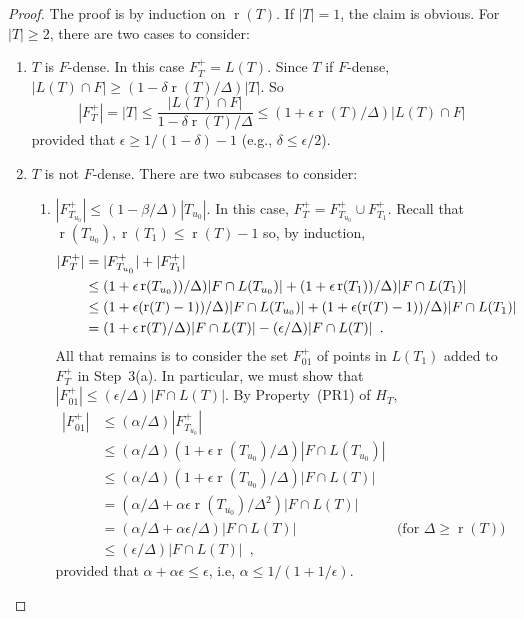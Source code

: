 \documentclass{patmorin}
\DeclareMathOperator{\rank}{r}
\begin{document}
\begin{proof}
  The proof is by induction on $\rank(T)$. If $|T|=1$, the claim is
  obvious. For $|T|\ge 2$, there are two cases to consider:
  \begin{enumerate}
    \item $T$ is $F$-dense. In this case $F^+_T=L(T)$.  
     Since $T$ if $F$-dense,  $|L(T)\cap F|\ge
     (1-\delta\rank(T)/\Delta)|T|$.  So
     \[
       |F^+_T|=|T|
	  \le \frac{|L(T)\cap F|}{1-\delta\rank(T)/\Delta} 
          \le (1+\epsilon\rank(T)/\Delta)|L(T)\cap F|
     \]
     provided that $\epsilon \ge 1/(1-\delta)-1$ (e.g., $\delta\le \epsilon/2$).

    \item $T$ is not $F$-dense. There are two subcases to consider:
    \begin{enumerate}
       \item $|F^+_{T_{u_0}}| \le (1-\beta/\Delta)|T_{u_0}|$.
         In this case, $F^+_T=F^+_{T_{u_0}}\cup F^+_{T_1}$.
         Recall that
        $\rank(T_{u_0}),\rank(T_1)\le\rank(T)-1$ so, by induction,
         \begin{align}
            |F^+_T| 
              & = |F^+_{T_{u_0}}| + |F^+_{T_{1}}|  \notag \\
              & \le (1+\epsilon\rank(T_{u_0}))/\Delta)|F\cap L(T_{u_0})| 
                    +(1+\epsilon\rank(T_{1}))/\Delta)|F\cap L(T_{1})| \notag \\
              & \le (1+\epsilon(\rank(T)-1))/\Delta)|F\cap L(T_{u_0})| 
                    +(1+\epsilon(\rank(T)-1))/\Delta)|F\cap L(T_{1})|  \notag \\
              & = (1+\epsilon\rank(T)/\Delta)|F\cap L(T)| - (\epsilon/\Delta)|F\cap L(T)| \enspace .
            \eqlabel{inductio}
         \end{align}
         All that remains is to consider the set $F^+_{01}$ of points
         in $L(T_1)$ added to $F^+_T$ in Step~3(a).  In particular,
         we must show that $|F^+_{01}|\le (\epsilon/\Delta)|F\cap L(T)|$. By
         Property~(PR1) of $H_T$,
          \begin{align*}
          |F^+_{01}| 
            & \le (\alpha/\Delta)|F^+_{T_{u_0}}| \\
            & \le (\alpha/\Delta)(1+\epsilon\rank(T_{u_0})/\Delta)|F\cap L(T_{u_0})| \\
            & \le (\alpha/\Delta)(1+\epsilon\rank(T_{u_0})/\Delta)|F\cap L(T)|\\
            & = (\alpha/\Delta+\alpha\epsilon\rank(T_{u_0})/\Delta^2)|F\cap L(T)| \\
            & = (\alpha/\Delta+\alpha\epsilon/\Delta)|F\cap L(T)| 
    	     & \text{(for $\Delta\ge \rank(T)$)} \\
    	& \le (\epsilon/\Delta)|F\cap L(T)| \enspace ,
       \end{align*}
       provided that $\alpha+\alpha\epsilon \le \epsilon$, i.e, 
       $\alpha \le 1/(1+1/\epsilon)$.   


\end{enumerate}
\end{enumerate}
\end{proof}
\end{document}
